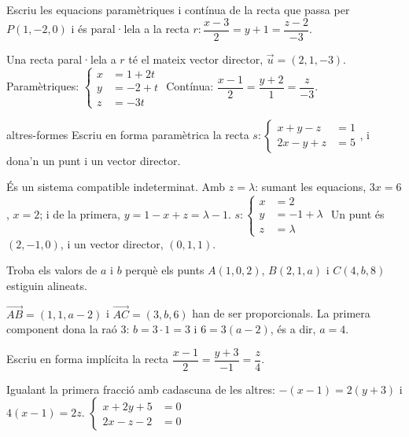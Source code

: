 \begin{apartats}

Escriu les equacions paramètriques i contínua de la recta que passa per $P(1,-2,0)$ i és paral·lela a
la recta $r\colon\dfrac{x-3}{2}=y+1=\dfrac{z-2}{-3}$.

\begin{solucio}
Una recta paral·lela a $r$ té el mateix vector director, $\vec u=(2,1,-3)$.\\
Paramètriques: $\left\{\begin{aligned}x&=1+2t\\y&=-2+t\\z&=-3t\end{aligned}\right.$\qquad
Contínua: $\dfrac{x-1}{2}=\dfrac{y+2}{1}=\dfrac{z}{-3}$.
\end{solucio}

\begin{tria}{altres-formes}
Escriu en forma paramètrica la recta
$s\colon\left\{\begin{aligned}x+y-z&=1\\2x-y+z&=5\end{aligned}\right.$, i dona'n un punt i un vector
director.

\begin{solucio}
És un sistema compatible indeterminat. Amb $z=\lambda$: sumant les equacions, $3x=6$, $x=2$; i de la
primera, $y=1-x+z=\lambda-1$.
$s\colon\left\{\begin{aligned}x&=2\\y&=-1+\lambda\\z&=\lambda\end{aligned}\right.$ Un punt és
$(2,-1,0)$, i un vector director, $(0,1,1)$.
\end{solucio}

Troba els valors de $a$ i $b$ perquè els punts $A(1,0,2)$, $B(2,1,a)$ i $C(4,b,8)$ estiguin alineats.

\begin{solucio}
$\overrightarrow{AB}=(1,1,a-2)$ i $\overrightarrow{AC}=(3,b,6)$ han de ser proporcionals. La primera
component dona la raó 3: $b=3\cdot1=3$ i $6=3(a-2)$, és a dir, $a=4$.
\end{solucio}
\end{tria}

\begin{nomesllarg}
Escriu en forma implícita la recta $\dfrac{x-1}{2}=\dfrac{y+3}{-1}=\dfrac{z}{4}$.

\begin{solucio}
Igualant la primera fracció amb cadascuna de les altres: $-(x-1)=2(y+3)$ i $4(x-1)=2z$.
$\left\{\begin{aligned}x+2y+5&=0\\2x-z-2&=0\end{aligned}\right.$
\end{solucio}
\end{nomesllarg}

\end{apartats}
